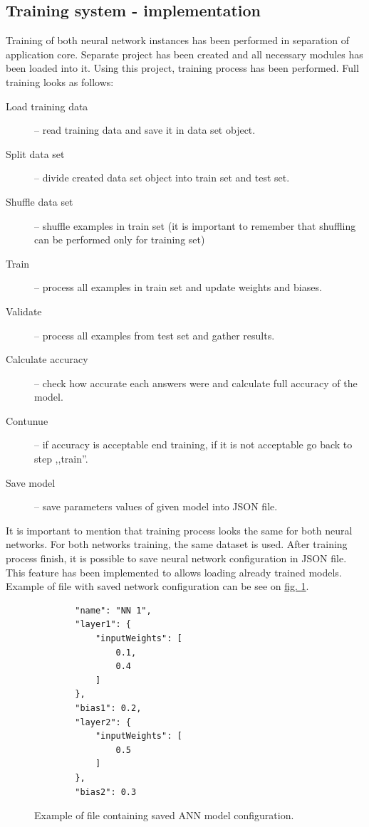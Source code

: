 \subsection{Training system - implementation}
Training of both neural network instances has been performed in separation of application core. Separate project has been created and all necessary modules has been loaded into it. Using this project, training process has been performed. Full training looks as follows:
\begin{description}
	\item[Load training data] -- read training data and save it in data set object.
	\item[Split data set] -- divide created data set object into train set and test set.
	\item[Shuffle data set] -- shuffle examples in train set (it is important to remember that shuffling can be performed only for training set) 
	\item[Train] -- process all examples in train set and update weights and biases.
	\item[Validate] -- process all examples from test set and gather results.
	\item[Calculate accuracy] -- check how accurate each answers were and calculate full accuracy of the model.
	\item[Contunue] -- if accuracy is acceptable end training, if it is not acceptable go back to step ,,train''.
	\item[Save model] -- save parameters values of given model into JSON file.  
\end{description}
It is important to mention that training process looks the same for both neural networks. For both networks training, the same dataset is used. After training process finish, it is possible to save neural network configuration in JSON file. This feature has been implemented to allows loading already trained models. Example of file with saved network configuration can be see on \hyperref[fig:saved-weights-example-ann]{fig. \ref*{fig:saved-weights-example-ann}}.
\begin{figure}
	\centering
	\begin{lstlisting}
		"name": "NN 1",
		"layer1": {
			"inputWeights": [
				0.1,
				0.4
			]
		},
		"bias1": 0.2,
		"layer2": {
			"inputWeights": [
				0.5
			]
		},
		"bias2": 0.3
	\end{lstlisting}
	\caption{Example of file containing saved ANN model configuration.}
	\label{fig:saved-weights-example-ann}
\end{figure}
